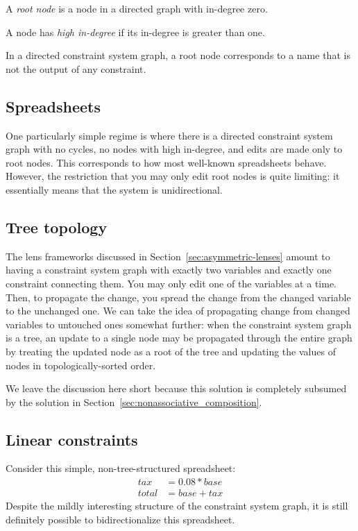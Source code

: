 \begin{definition}
    A \emph{root node} is a node in a directed graph with in-degree zero.
\end{definition}

\begin{definition}
    A node has \emph{high in-degree} if its in-degree is greater than one.
\end{definition}

In a directed constraint system graph, a root node corresponds to a name
that is not the output of any constraint.

\subsection{Spreadsheets}
One particularly simple regime is where there is a directed constraint
system graph with no cycles, no nodes with high in-degree, and edits are
made only to root nodes. This corresponds to how most well-known
spreadsheets behave. However, the restriction that you may only edit root
nodes is quite limiting: it essentially means that the system is
unidirectional.

\subsection{Tree topology}
The lens frameworks discussed in Section~\ref{sec:asymmetric-lenses} amount to having a
constraint system graph with exactly two variables and exactly one
constraint connecting them. You may only edit one of the variables at a
time. Then, to propagate the change, you spread the change from the changed
variable to the unchanged one.
%
We can take the idea of propagating change from changed variables to
untouched ones somewhat further: when the constraint system graph is a tree, an
update to a single node may be propagated through the entire graph by
treating the updated node as a root of the tree and updating the values of
nodes in topologically-sorted order.

We leave the discussion here short because this solution is completely
subsumed by the solution in Section~\ref{sec:nonassociative_composition}.

\subsection{Linear constraints}
\label{sec:linear_constraints}
Consider this simple, non-tree-structured spreadsheet:
\begin{align*}
    tax &= 0.08*base \\
    total &= base + tax
\end{align*}
Despite the mildly interesting structure of the constraint system graph, it
is still definitely possible to bidirectionalize this spreadsheet.


